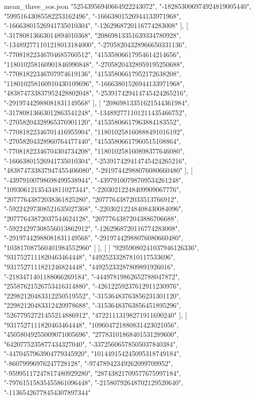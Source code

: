 \begin{filecontents*}[overwrite]{mean_three_sos.json}
    "52543956940664922243072",
    "-182853006974924819005440",
    "59951643085582253162496",
    "-16663801526944133971968",
    "-16663801526941735010304",
    "-1262968720116774283008"
   ],
   [
    "-31780813663014894010368",
    "20869813351639334780928",
    "-134892771101218013184000",
    "-27058204328966650331136",
    "-77081822346704685760512",
    "41535806617954614214656",
    "118010258160901846990848",
    "-27058204328959195250688",
    "-77081822346707974619136",
    "41535806617952172638208",
    "118010258160910430109696",
    "-16663801526944133971968",
    "483874733837952428802048",
    "-253917429414745424265216",
    "-29197442988081831149568"
   ],
   [
    "20869813351621544361984",
    "-31780813663012863541248",
    "-134892771101211435466752",
    "-27058204328965376901120",
    "41535806617963884183552",
    "-77081822346701416955904",
    "118010258160888491016192",
    "-27058204328960764477440",
    "41535806617960515108864",
    "-77081822346704304734208",
    "118010258160898377646080",
    "-16663801526941735010304",
    "-253917429414745424265216",
    "483874733837947455406080",
    "-29197442988076080660480"
   ],
   [
    "-43979100798698499538944",
    "-43979100798709534261248",
    "10930612135434811027344",
    "-22030212248409909067776",
    "20777643872038361825280",
    "20777643872033513766912",
    "-59224297308521635027368",
    "-22030212248408430084096",
    "20777643872037544624128",
    "20777643872043886706688",
    "-59224297308556013862912",
    "-1262968720116774283008",
    "-29197442988081831149568",
    "-29197442988076080660480",
    "103817087560401984552960"
   ]
  ],
  [
   [
    "92959080241037946126336",
    "9317527111820463464448",
    "44925233287810117533696",
    "9317527111821246824448",
    "44925233287809891926016",
    "-2183471401188066269184",
    "-44497819862652788047872",
    "25587621526753416314880",
    "-42612259237612911230976",
    "22982120483312250519552",
    "-31536483763856231301120",
    "22982120483312420978688",
    "-31536483763856451895296",
    "52677952721455214886912",
    "47221113198271911690240"
   ],
   [
    "9317527111820463464448",
    "109604721880831423021056",
    "45058049255009071005696",
    "27783101868401531289600",
    "6420775235877434327040",
    "-33725606578505037840384",
    "-4470457963904779345920",
    "101449154245095318749184",
    "-86079996976247728128",
    "-97478942349262099709952",
    "-95995117247817480929280",
    "28743821709577675997184",
    "-79761515835455861096448",
    "-21580792648702129520640",
    "-11365426778454307897344"

\end{filecontents*}
